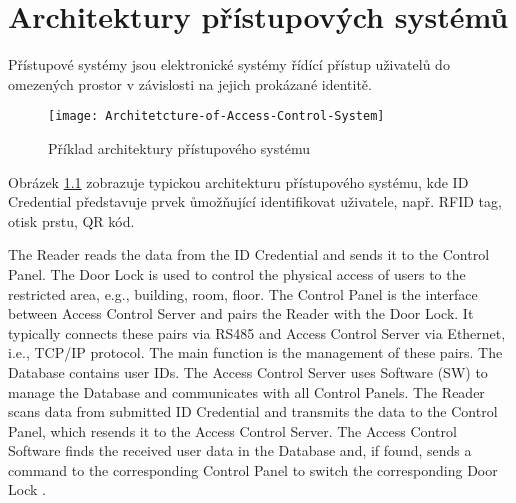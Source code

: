 \chapter{Architektury přístupových systémů}
Přístupové systémy jsou elektronické systémy řídící přístup uživatelů do omezených prostor v závislosti na jejich prokázané identitě.
 
\begin{figure}[!h]
    \centering
    \texttt{[image: Architetcture-of-Access-Control-System]}
    \caption{Příklad architektury přístupového systému \cite{accessControlSystem_eiprocus}}
    \label{fig:Access control system architecture}
\end{figure}

Obrázek \ref{fig:Access control system architecture} zobrazuje typickou architekturu přístupového systému, kde ID Credential představuje prvek ůmožňující identifikovat uživatele, např. RFID tag, otisk prstu, QR kód.



The Reader reads the data from the ID Credential and sends it to the Control Panel.
The Door Lock is used to control the physical access of users to the restricted area, e.g., building, room, floor.
The Control Panel is the interface between Access Control Server and pairs the Reader with the Door Lock. It typically connects these pairs via RS485 and Access Control Server via Ethernet, i.e., TCP/IP protocol. The main function is the management of these pairs.
The Database contains user IDs.
The Access Control Server uses Software (SW) to manage the Database and communicates with all Control Panels.
The Reader scans data from submitted ID Credential and transmits the data to the Control Panel, which resends it to the Access Control Server.
The Access Control Software finds the received user data in the Database and, if found, sends a command to the corresponding Control Panel to switch the corresponding Door Lock \cite{accessControlSystem_eiprocus}.
